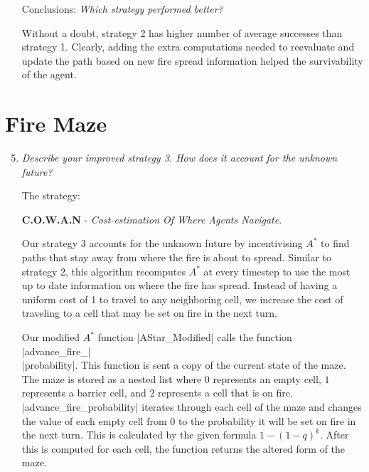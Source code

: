 \documentclass[12pt, twoside]{article}
\begin{document}
\begin{itemize}
    \item[Conclusions:]
        \textit{Which strategy performed better?}

        \vspace{4mm}
        Without a doubt, strategy 2 has higher number of average successes than strategy 1. Clearly, adding the extra computations needed to reevaluate and update the path based on new fire spread information helped the survivability of the agent. 


\end{itemize}

\section{Fire Maze}
\begin{enumerate}
    \setcounter{enumi}{4}

    \item 
        \textit{Describe your improved strategy 3. How does it account for the unknown future?}

        \vspace{4mm}
        The strategy: \par
        \textbf{C.O.W.A.N} - \textit{Cost-estimation Of Where Agents Navigate}.

        \vspace{4mm}
        Our strategy 3 accounts for the unknown future by incentivising $A^*$ to find paths that stay away from where the fire is about to spread. Similar to strategy 2, this algorithm recomputes $A^*$ at every timestep to use the most up to date information on where the fire has spread. Instead of having a uniform cost of 1 to travel to any neighboring cell, we increase the cost of traveling to a cell that may be set on fire in the next turn.
        
        \vspace{4mm}
        Our modified $A^*$ function \cverb|AStar_Modified| calls the function \cverb|advance_fire_| \\ \cverb|probability|. This function is sent a copy of the current state of the maze. The maze is stored as a nested list where $0$ represents an empty cell, $1$ represents a barrier cell, and $2$ represents a cell that is on fire. \cverb|advance_fire_probability| iterates through each cell of the maze and changes the value of each empty cell from 0 to the probability it will be set on fire in the next turn. This is calculated by the given formula $1-(1-q)^k$. After this is computed for each cell, the function returns the altered form of the maze.
        

\end{enumerate}
\end{document}
